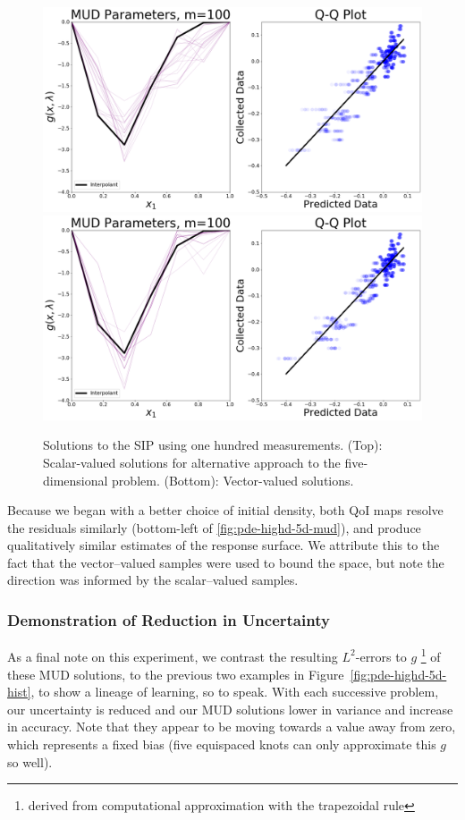\begin{figure}[htbp]
\centering
  \includegraphics[width=0.95\linewidth]{figures/pde-highd/pde-highd_pair_D-alt-5-1_m100.png}
  \includegraphics[width=0.95\linewidth]{figures/pde-highd/pde-highd_pair_D-alt-5-5_m100.png}
\caption{Solutions to the SIP using one hundred measurements.
(Top): Scalar-valued solutions for alternative approach to the five-dimensional problem.
(Bottom): Vector-valued solutions.
}
\label{fig:pde-highd-5d-alt-mud}
\end{figure}
\FloatBarrier

Because we began with a better choice of initial density, both QoI maps resolve the residuals similarly (bottom-left of \ref{fig:pde-highd-5d-mud}), and produce qualitatively similar estimates of the response surface. We attribute this to the fact that the vector--valued samples were used to bound the space, but note the direction was informed by the scalar--valued samples.

\subsubsection{Demonstration of Reduction in Uncertainty}

As a final note on this experiment, we contrast the resulting $L^2$-errors to $g$ \footnote{derived from computational approximation with the trapezoidal rule} of these MUD solutions, to the previous two examples in Figure~\ref{fig:pde-highd-5d-hist}, to show a lineage of learning, so to speak.
With each successive problem, our uncertainty is reduced and our MUD solutions lower in variance and increase in accuracy.
Note that they appear to be moving towards a value away from zero, which represents a fixed bias (five equispaced knots can only approximate this $g$ so well).

